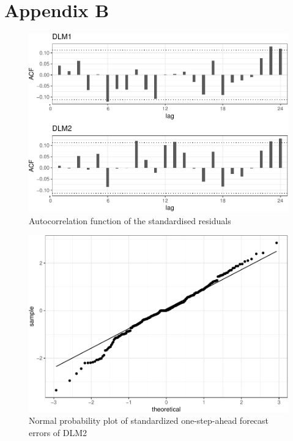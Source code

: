 \documentclass[]{article}
\begin{document}
\section{Appendix B}\label{appendix-b}

\begin{figure}
\centering
\includegraphics{../figs/freq--residual-autocorr-1.pdf}
\caption{\label{fig:residual-autocorr}Autocorrelation function of the
standardised residuals}
\end{figure}

\begin{figure}
\centering
\includegraphics{../figs/freq--qqnorm-1.pdf}
\caption{\label{fig:qqnorm}Normal probability plot of standardized
one-step-ahead forecast errors of DLM2}
\end{figure}
\end{document}
